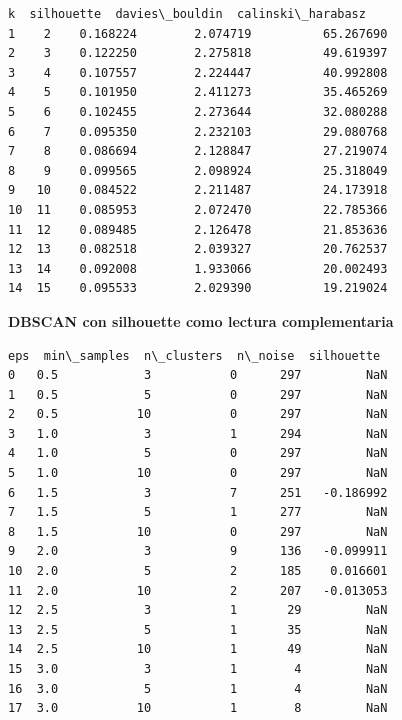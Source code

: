\documentclass[11pt]{article}
\begin{document}
    \begin{Verbatim}[commandchars=\\\{\}]
     k  silhouette  davies\_bouldin  calinski\_harabasz
1    2    0.168224        2.074719          65.267690
2    3    0.122250        2.275818          49.619397
3    4    0.107557        2.224447          40.992808
4    5    0.101950        2.411273          35.465269
5    6    0.102455        2.273644          32.080288
6    7    0.095350        2.232103          29.080768
7    8    0.086694        2.128847          27.219074
8    9    0.099565        2.098924          25.318049
9   10    0.084522        2.211487          24.173918
10  11    0.085953        2.072470          22.785366
11  12    0.089485        2.126478          21.853636
12  13    0.082518        2.039327          20.762537
13  14    0.092008        1.933066          20.002493
14  15    0.095533        2.029390          19.219024
    \end{Verbatim}

    
    \textbf{DBSCAN con silhouette como lectura complementaria}

    
    
    \begin{Verbatim}[commandchars=\\\{\}]
    eps  min\_samples  n\_clusters  n\_noise  silhouette
0   0.5            3           0      297         NaN
1   0.5            5           0      297         NaN
2   0.5           10           0      297         NaN
3   1.0            3           1      294         NaN
4   1.0            5           0      297         NaN
5   1.0           10           0      297         NaN
6   1.5            3           7      251   -0.186992
7   1.5            5           1      277         NaN
8   1.5           10           0      297         NaN
9   2.0            3           9      136   -0.099911
10  2.0            5           2      185    0.016601
11  2.0           10           2      207   -0.013053
12  2.5            3           1       29         NaN
13  2.5            5           1       35         NaN
14  2.5           10           1       49         NaN
15  3.0            3           1        4         NaN
16  3.0            5           1        4         NaN
17  3.0           10           1        8         NaN
    \end{Verbatim}

    
    \begin{center}
    \end{center}
    { \hspace*{\fill} \\}
    
\end{document}

